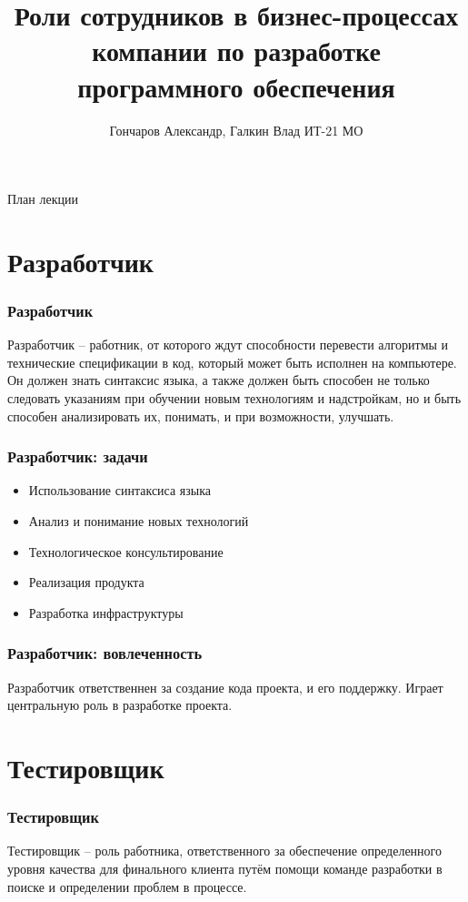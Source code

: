 \documentclass{../industrial-development}
\title{Роли сотрудников в бизнес-процессах компании по разработке программного обеспечения}
\author{Гончаров Александр, Галкин Влад ИТ-21 МО}
\date{}
\begin{document}
	
	\begin{frame}
		\titlepage
	\end{frame}
	
	\begin{frame}{План лекции}
		\tableofcontents
	\end{frame}
	
	
	\section{Разработчик }
	
	\begin{frame} \frametitle{Разработчик}
		\begin{block}{}
			\alert {}Разработчик – работник, от которого ждут способности перевести алгоритмы и технические спецификации в код, который может быть исполнен на компьютере. Он должен знать синтаксис языка, а также должен быть способен не только следовать указаниям при обучении новым технологиям и надстройкам, но и быть способен анализировать их, понимать, и при возможности, улучшать.
			
		\end{block}
		
	\end{frame}
	
	\begin{frame} \frametitle{Разработчик: задачи}
		\begin{itemize}
			\item Использование синтаксиса языка
			\item Анализ и понимание новых технологий
			\item Технологическое консультирование
			\item Реализация продукта
			\item Разработка инфраструктуры
		\end{itemize}
	\end{frame}

	\begin{frame} \frametitle{Разработчик: вовлеченность}
		Разработчик ответственнен за создание кода проекта, и его поддержку. Играет центральную роль в разработке проекта.
	\end{frame}
	
	\section{Тестировщик }
	
	\begin{frame} \frametitle{Тестировщик}
		\begin{block}{}
			\alert {Тестировщик} – роль работника, ответственного за обеспечение определенного уровня качества для финального клиента путём помощи команде разработки в поиске и определении проблем в процессе.
		\end{block}
		
	\end{frame}
	
\end{document}
